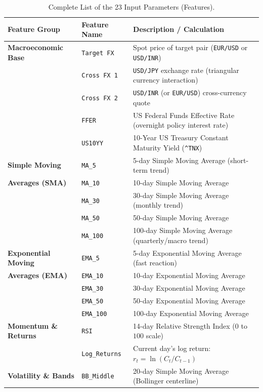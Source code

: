 \documentclass[11pt,oneside,letterpaper,english]{article}
\begin{document}
\begin{table}[H]
\centering
\caption{Complete List of the 23 Input Parameters (Features).}
\label{tab:input-features}
\small
\setlength{\tabcolsep}{6pt}
\begin{tabular}{lll}
\toprule
\textbf{Feature Group} & \textbf{Feature Name} & \textbf{Description / Calculation} \\
\midrule
\textbf{Macroeconomic Base} & \texttt{Target FX} & Spot price of target pair (\texttt{EUR/USD} or \texttt{USD/INR}) \\
& \texttt{Cross FX 1} & \texttt{USD/JPY} exchange rate (triangular currency interaction) \\
& \texttt{Cross FX 2} & \texttt{USD/INR} (or \texttt{EUR/USD}) cross-currency quote \\
& \texttt{FFER} & US Federal Funds Effective Rate (overnight policy interest rate) \\
& \texttt{US10YY} & 10-Year US Treasury Constant Maturity Yield (\texttt{\textasciicircum TNX}) \\
\midrule
\textbf{Simple Moving} & \texttt{MA\_5} & 5-day Simple Moving Average (short-term trend) \\
\textbf{Averages (SMA)} & \texttt{MA\_10} & 10-day Simple Moving Average \\
& \texttt{MA\_30} & 30-day Simple Moving Average (monthly trend) \\
& \texttt{MA\_50} & 50-day Simple Moving Average \\
& \texttt{MA\_100} & 100-day Simple Moving Average (quarterly/macro trend) \\
\midrule
\textbf{Exponential Moving} & \texttt{EMA\_5} & 5-day Exponential Moving Average (fast reaction) \\
\textbf{Averages (EMA)} & \texttt{EMA\_10} & 10-day Exponential Moving Average \\
& \texttt{EMA\_30} & 30-day Exponential Moving Average \\
& \texttt{EMA\_50} & 50-day Exponential Moving Average \\
& \texttt{EMA\_100} & 100-day Exponential Moving Average \\
\midrule
\textbf{Momentum \& Returns} & \texttt{RSI} & 14-day Relative Strength Index ($0$ to $100$ scale) \\
& \texttt{Log\_Returns} & Current day's log return: $r_t = \ln(C_t / C_{t-1})$ \\
\midrule
\textbf{Volatility \& Bands} & \texttt{BB\_Middle} & 20-day Simple Moving Average (Bollinger centerline) \\

\end{tabular}
\end{table}
\end{document}
